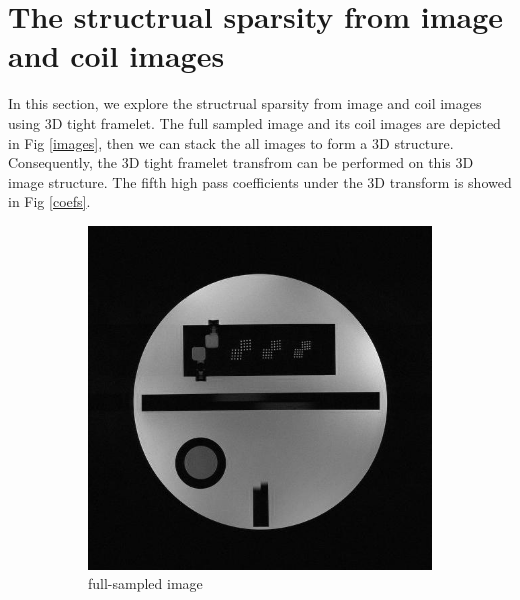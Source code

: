 \documentclass[UTF8]{article}
\begin{document}
\section{The structrual sparsity from image and coil images}
\par In this section, we explore the structrual sparsity from image and coil images using 3D tight framelet. The full sampled image and its coil images are depicted in Fig \ref{images}, then we can stack the all images to  form a 3D structure. Consequently,  the 3D tight framelet transfrom can be performed on this 3D image structure. The fifth high pass coefficients under the 3D transform is showed in Fig \ref{coefs}. 
\begin{figure}[ht]
	
	\centering
	\begin{subfigure}[t]{0.15\textwidth}
		\centering
		\includegraphics[width=\textwidth]{./image/full.jpg}
		\caption{full-sampled image}
		\label{fig:1a}
	\end{subfigure}
	\begin{subfigure}[t]{0.15\textwidth}
		\centering

\end{subfigure}
\end{figure}
\end{document}
